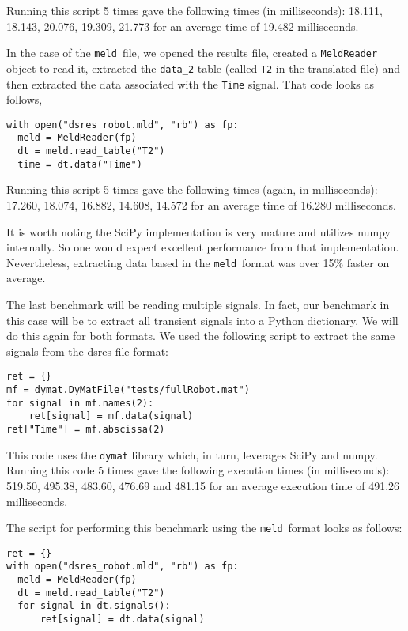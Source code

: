 \documentclass[11pt,a4paper,twocolumn]{article}
\newcommand{\meld}{\texttt{meld}}
\newcommand{\code}[1]{\texttt{#1}} %
\begin{document}
Running this script 5 times gave the following times (in
milliseconds): 18.111, 18.143, 20.076, 19.309, 21.773 for an average time
of 19.482 milliseconds.

In the case of the \meld\ file, we opened the results file, created a
\code{MeldReader} object to read it, extracted the \code{data\_2}
table (called \code{T2} in the translated file) and then extracted the
data associated with the \code{Time} signal.  That code looks as
follows,

\begin{verbatim}
with open("dsres_robot.mld", "rb") as fp:
  meld = MeldReader(fp)
  dt = meld.read_table("T2")
  time = dt.data("Time")
\end{verbatim}

Running this script 5 times gave the following times (again, in
milliseconds): 17.260, 18.074, 16.882, 14.608, 14.572 for an average
time of 16.280 milliseconds.

It is worth noting the SciPy implementation is very mature and
utilizes numpy internally.  So one would expect excellent performance
from that implementation.  Nevertheless, extracting data based in the
\meld\ format was over 15\% faster on average.


The last benchmark will be reading multiple signals.  In fact, our
benchmark in this case will be to extract all transient signals into a
Python dictionary.  We will do this again for both formats.  We used
the following script to extract the same signals from the dsres file
format:

\begin{verbatim}
ret = {}
mf = dymat.DyMatFile("tests/fullRobot.mat")
for signal in mf.names(2):
    ret[signal] = mf.data(signal)
ret["Time"] = mf.abscissa(2)
\end{verbatim}

This code uses the \code{dymat} library which, in turn, leverages
SciPy and numpy.  Running this code 5 times gave the following
execution times (in milliseconds): 519.50, 495.38, 483.60, 476.69 and
481.15 for an average execution time of 491.26 milliseconds.

The script for performing this benchmark using the \meld\ format looks
as follows:

\begin{verbatim}
ret = {}
with open("dsres_robot.mld", "rb") as fp:
  meld = MeldReader(fp)
  dt = meld.read_table("T2")
  for signal in dt.signals():
      ret[signal] = dt.data(signal)
\end{verbatim}
\end{document}
